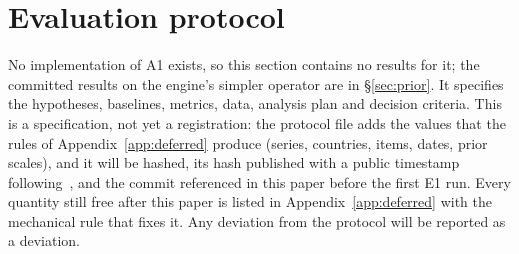 \documentclass[10pt]{article}
\theoremstyle{remark}
\begin{document}
\section{Evaluation protocol}
\label{sec:protocol}

No implementation of A1 exists, so this section contains no results for it; the committed results on the engine's simpler operator are in \S\ref{sec:prior}. It specifies the hypotheses, baselines, metrics, data, analysis plan and decision criteria. This is a specification, not yet a registration: the protocol file adds the values that the rules of Appendix~\ref{app:deferred} produce (series, countries, items, dates, prior scales), and it will be hashed, its hash published with a public timestamp following~\cite{rw_receipts}, and the commit referenced in this paper before the first E1 run. Every quantity still free after this paper is listed in Appendix~\ref{app:deferred} with the mechanical rule that fixes it. Any deviation from the protocol will be reported as a deviation.
\end{document}
